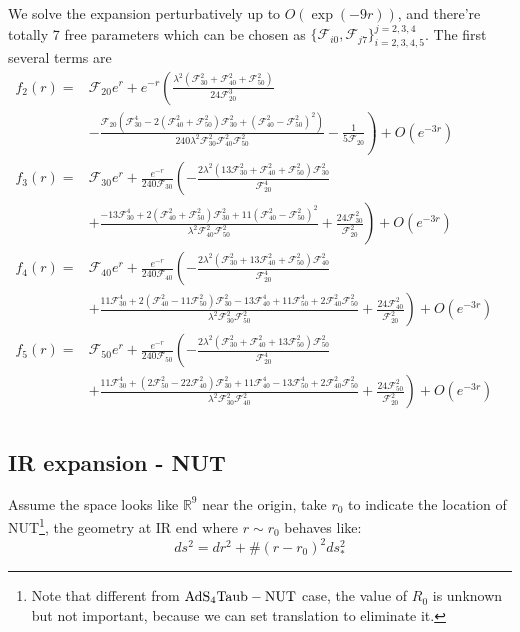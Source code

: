 \documentclass[12pt, a4paper]{article}
\numberwithin{equation}{section}
\newcommand{\be}{\begin{equation}}
\newcommand{\ee}{\end{equation}}
\newcommand{\cF}{\mathcal{F}}
\begin{document}
We solve the expansion perturbatively up to $O(\exp(-9r))$, and there're totally 7 free parameters which can be chosen as $\{\cF_{i0}, \cF_{j7}\}_{i = 2,3,4,5}^{j = 2,3,4}$. The first several terms are
\be
\begin{aligned}
	f_2(r) = &\cF_{20}e^{r} + e^{-r} \left(\frac{\lambda ^2 \left(\cF_{30}^2+\cF_{40}^2+\cF_{50}^2\right)}{24
		\cF_{20}^3}\right.&\\
	&\left.-\frac{\cF_{20} \left(\cF_{30}^4-2
		\left(\cF_{40}^2+\cF_{50}^2\right)
		\cF_{30}^2+\left(\cF_{40}^2-\cF_{50}^2\right)^2\right)}{240 \lambda ^2
		\cF_{30}^2 \cF_{40}^2 \cF_{50}^2}-\frac{1}{5 \cF_{20}}\right) + O(e^{-3r})&\\
	f_3(r) = &\cF_{30}e^{r} + \frac{e^{-r}}{240\cF_{30}}\left( -\frac{2 \lambda ^2 \left(13 \cF_{30}^2+\cF_{40}^2+\cF_{50}^2\right)
		\cF_{30}^2}{\cF_{20}^4}\right.&\\
	&\left.	+\frac{-13 \cF_{30}^4+2
		\left(\cF_{40}^2+\cF_{50}^2\right) \cF_{30}^2+11
		\left(\cF_{40}^2-\cF_{50}^2\right)^2}{\lambda ^2 \cF_{40}^2
		\cF_{50}^2}+\frac{24 \cF_{30}^2}{\cF_{20}^2}\right) +O(e^{-3r})&\\
	f_4(r) = &\cF_{40}e^{r} + \frac{e^{-r}}{240\cF_{40}}\left(-\frac{2 \lambda ^2 \left(\cF_{30}^2+13 \cF_{40}^2+\cF_{50}^2\right)
		\cF_{40}^2}{\cF_{20}^4}\right.&\\
	&\left.	+\frac{11 \cF_{30}^4+2 \left(\cF_{40}^2-11
		\cF_{50}^2\right) \cF_{30}^2-13 \cF_{40}^4+11 \cF_{50}^4+2
		\cF_{40}^2 \cF_{50}^2}{\lambda ^2 \cF_{30}^2 \cF_{50}^2}+\frac{24
		\cF_{40}^2}{\cF_{20}^2}\right) + O(e^{-3r})&\\
	f_5(r) =  &\cF_{50}e^{r} + \frac{e^{-r}}{240\cF_{50}}\left(-\frac{2 \lambda ^2 \left(\cF_{30}^2+\cF_{40}^2+13 \cF_{50}^2\right)
		\cF_{50}^2}{\cF_{20}^4}\right.&\\
	&\left.	+\frac{11 \cF_{30}^4+\left(2 \cF_{50}^2-22
		\cF_{40}^2\right) \cF_{30}^2+11 \cF_{40}^4-13 \cF_{50}^4+2
		\cF_{40}^2 \cF_{50}^2}{\lambda ^2 \cF_{30}^2 \cF_{40}^2}+\frac{24
		\cF_{50}^2}{\cF_{20}^2}\right) + O(e^{-3r})&\\
\end{aligned}
\ee

	\subsection{IR expansion - NUT}
	Assume the space looks like $\mathbb{R}^9$ near the origin, take $r_0$ to indicate the location of NUT\footnote{Note that different from ${\rm AdS_4 Taub-NUT}$ case, the value of $R_0$ is unknown but not important, because we can set translation to eliminate it.}, the geometry at IR end where $r \sim r_0$ behaves like: 
\be
	ds^2 = dr^2 + \# (r-r_0)^2 ds_*^2
\ee
\end{document}
